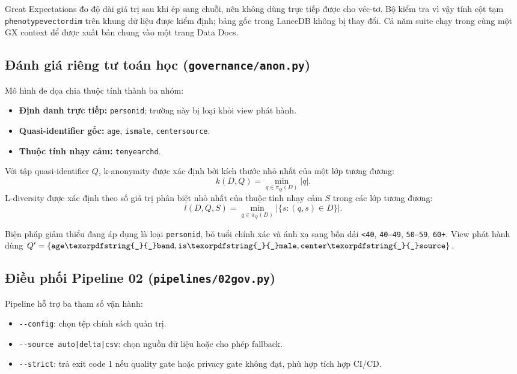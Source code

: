 \documentclass[11pt,a4paper]{article}
\renewcommand{\_}{\texorpdfstring{\origunderscore\allowbreak}{\origunderscore}}
\begin{document}
Great Expectations đo độ dài giá trị sau khi ép sang chuỗi, nên không dùng trực tiếp được cho véc-tơ. Bộ kiểm tra vì vậy tính cột tạm \texttt{phenotype\_vector\_dim} trên khung dữ liệu được kiểm định; bảng gốc trong LanceDB không bị thay đổi. Cả năm suite chạy trong cùng một GX context để được xuất bản chung vào một trang Data Docs.

\subsection{Đánh giá riêng tư toán học (\texttt{governance/anon.py})}

Mô hình đe dọa chia thuộc tính thành ba nhóm:

\begin{itemize}
    \item \textbf{Định danh trực tiếp:} \texttt{person\_id}; trường này bị loại khỏi view phát hành.
    \item \textbf{Quasi-identifier gốc:} \texttt{age}, \texttt{is\_male}, \texttt{center\_source}.
    \item \textbf{Thuộc tính nhạy cảm:} \texttt{ten\_year\_chd}.
\end{itemize}

Với tập quasi-identifier $Q$, k-anonymity được xác định bởi kích thước nhỏ nhất của một lớp tương đương:
\[
k(D,Q)=\min_{q\in\pi_Q(D)}|q|.
\]
L-diversity được xác định theo số giá trị phân biệt nhỏ nhất của thuộc tính nhạy cảm $S$ trong các lớp tương đương:
\[
l(D,Q,S)=\min_{q\in\pi_Q(D)}\left|\{s:(q,s)\in D\}\right|.
\]

Biện pháp giảm thiểu đang áp dụng là loại \texttt{person\_id}, bỏ tuổi chính xác và ánh xạ sang bốn dải \texttt{<40}, \texttt{40--49}, \texttt{50--59}, \texttt{60+}. View phát hành dùng $Q'=\{\texttt{age\_band},\texttt{is\_male},\texttt{center\_source}\}$.

\subsection{Điều phối Pipeline 02 (\texttt{pipelines/02\_gov.py})}

Pipeline hỗ trợ ba tham số vận hành:

\begin{itemize}
    \item \texttt{-{}-config}: chọn tệp chính sách quản trị.
    \item \texttt{-{}-source auto|delta|csv}: chọn nguồn dữ liệu hoặc cho phép fallback.
    \item \texttt{-{}-strict}: trả exit code 1 nếu quality gate hoặc privacy gate không đạt, phù hợp tích hợp CI/CD.
\end{itemize}
\end{document}
